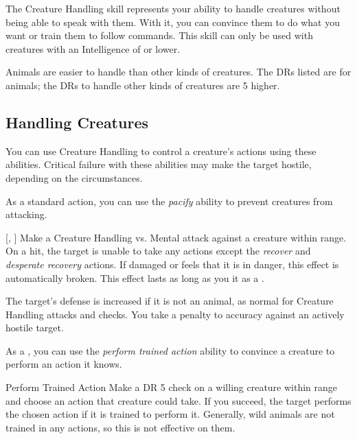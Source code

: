 \newpage
{}
    The Creature Handling skill represents your ability to handle creatures without being able to speak with them. With it, you can convince them to do what you want or train them to follow commands. This skill can only be used with creatures with an Intelligence of  or lower.

        Animals are easier to handle than other kinds of creatures.
        The DRs listed are for animals; the DRs to handle other kinds of creatures are 5 higher.

    \subsection{Handling Creatures}
        You can use Creature Handling to control a creature's actions using these abilities.
        Critical failure with these abilities may make the target hostile, depending on the circumstances.

        As a standard action, you can use the \textit{pacify} ability to prevent creatures from attacking.

        \begin{ability}{}[, ]
            Make a Creature Handling vs. Mental attack against a creature within \rngmed range.
            On a hit, the target is unable to take any actions except the \textit{recover} and \textit{desperate recovery} actions.
            If damaged or feels that it is in danger, this effect is automatically broken.
            This effect lasts as long as you  it as a .

            The target's defense is increased if it is not an animal, as normal for Creature Handling attacks and checks.
            You take a  penalty to accuracy against an actively hostile target.
        \end{ability}

        As a , you can use the \textit{perform trained action} ability to convince a creature to perform an action it knows.

        \begin{ability}{Perform Trained Action}
            Make a DR 5 check on a willing creature within \rnglong range and choose an action that creature could take.
            If you succeed, the target performs the chosen action if it is trained to perform it.
            Generally, wild animals are not trained in any actions, so this is not effective on them.
        \end{ability}

